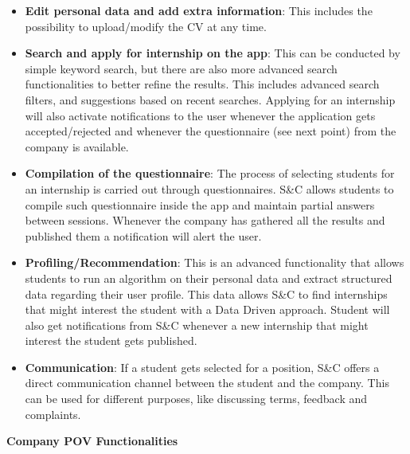 \begin{itemize}
      \item \textbf{Edit personal data and add extra information}: This includes the possibility to upload/modify the
            CV at any time.
      \item \textbf{Search and apply for internship on the app}: This can be conducted by simple keyword search, but
            there are also more advanced search functionalities to better refine the results. This includes advanced
            search filters, and suggestions based on recent searches. Applying for an internship will also activate
            notifications to the user whenever the application gets accepted/rejected and whenever the questionnaire
            (see next point) from the company is available.
      \item \textbf{Compilation of the questionnaire}: The process of selecting students for an internship is carried
            out through questionnaires. S\&C allows students to compile such questionnaire inside the app and maintain
            partial answers between sessions. Whenever the company has gathered all the results and published them a
            notification will alert the user.
      \item \textbf{Profiling/Recommendation}: This is an advanced functionality that allows students to run an
            algorithm on their personal data and extract structured data regarding their user profile. This data allows
            S\&C to find internships that might interest the student with a Data Driven approach. Student will also get
            notifications from S\&C whenever a new internship that might interest the student gets published.
      \item \textbf{Communication}: If a student gets selected for a position, S\&C offers a direct communication
            channel between the student and the company. This can be used for different purposes, like discussing
            terms, feedback and complaints.
\end{itemize}

\par\textbf{Company POV Functionalities}

